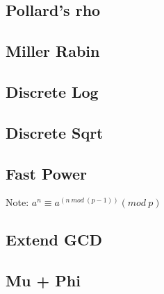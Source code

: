 \documentclass[a4paper,10pt,twocolumn,oneside]{article}
\begin{document}
\subsection{Pollard's rho}



\subsection{Miller Rabin}


\subsection{Discrete Log}

%

\subsection{Discrete Sqrt}

%

\subsection{Fast Power}
{ \normalsize
Note: $a^n \equiv a^{(n \ mod \ (p-1))} (mod \ p)$
}

\subsection{Extend GCD}


\subsection{Mu + Phi}

\end{document}
